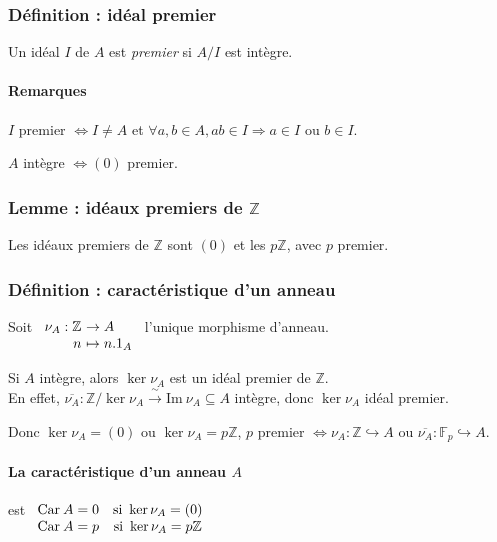 \documentclass[reqno,a4paper,10pt]{report}
\makeatletter
\newcommand{\im}{\mathrm{Im}\:} %
\newcommand{\car}{\mathrm{Car}\:} %
\newcommand{\IZ}{\ensuremath{\mathbb{Z}}\xspace} %
\newcommand{\so}{\Rightarrow}
\newcommand{\inj}{\hookrightarrow}
\newcommand{\bij}{\overset{\!\sim}{\to}} %
\let\olditemize=\itemize%
\renewenvironment{itemize}{%
    \olditemize%
  }{%
    \@noparlisttrue%
    \endlist%
  }%
\makeatother
\begin{document}
\subsubsection{Définition : idéal premier}
Un idéal $I$ de $A$ est \emph{premier} si $A/I$ est intègre.

\paragraph{Remarques}
\begin{itemize}
  \item $I$ premier $\iff I \neq A$ et $\forall a,b \in A, ab\in I \so a
    \in I$ ou $b \in I$.
  \item $A$ intègre $\iff (0)$ premier.
\end{itemize}

\subsubsection{Lemme : idéaux premiers de $\IZ$}
Les idéaux premiers de $\IZ$ sont $(0)$ et les $p\IZ$, avec $p$ premier.
\begin{comment}
  Preuve 04/11/09 p2
\end{comment}

\subsubsection{Définition : caractéristique d'un anneau}
Soit $\begin{array}[t]{r@{\ }l}
  \nu_A : \IZ &\to A\\
  n &\mapsto n.1_A
\end{array}$ l'unique morphisme d'anneau.

Si $A$ intègre, alors $\ker \nu_A$ est un idéal premier de $\IZ$.\\
En effet, $\overline{\nu_A}:\IZ/\ker \nu_A \bij \im \nu_A \subseteq A$ intègre,
donc $\ker \nu_A$ idéal premier.

Donc $\ker \nu_A = (0)$ ou $\ker \nu_A=p\IZ$, $p$ premier $\iff \nu_A:\IZ \inj
A$ ou $\overline{\nu_A}:\mathbb{F}_p \inj A$.

\paragraph{La caractéristique d'un anneau $A$} est
$\begin{array}[t]{cc}
  \car A = 0 & \text{si } \ker \nu_A=(0)\\
  \car A = p & \text{si } \ker \nu_A=p\IZ
\end{array}$
\end{document}
